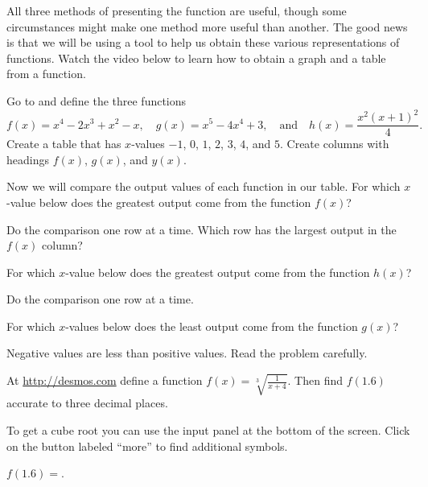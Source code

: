 \documentclass{ximera}
\begin{document}
All three methods of presenting the function are useful, though some circumstances might make one method more useful than another. The good news is that we will be using a tool to help us obtain these various representations of functions. Watch the video below to learn how to obtain a graph and a table from a function.

\begin{question}
Go to  and define the three functions 
\[
f(x)=x^4-2x^3+x^2-x,\quad g(x)=x^5-4x^4+3,\quad\text{and}\quad h(x)=\frac{x^2(x+1)^2}{4}.
\]
Create a table that has $x$-values $-1$, $0$, $1$, $2$, $3$, $4$, and $5$. Create columns with headings $f(x)$, $g(x)$, and $y(x)$.

Now we will compare the output values of each function in our table. For which $x$-value below does the greatest output come from the function $f(x)$?

    \begin{multipleChoice}
    \end{multipleChoice}
    \begin{hint}
    Do the comparison one row at a time. Which row has the largest output in the $f(x)$ column?
    \end{hint}    
For which $x$-value below does the greatest output come from the function $h(x)$?
    \begin{multipleChoice}
    \end{multipleChoice}
    \begin{hint}
    Do the comparison one row at a time.
    \end{hint}
For which $x$-values below does the least output come from the function $g(x)$?
    \begin{multipleChoice}
    \end{multipleChoice}
    \begin{hint}
    Negative values are less than positive values. Read the problem carefully.
    \end{hint}

\end{question}

\begin{question}
At \href{http://desmos.com}{http://desmos.com} define a function $f(x)=\sqrt[3]{\frac{1}{x+4}}$. Then find $f(1.6)$ accurate to three decimal places.

\begin{hint}
To get a cube root you can use the input panel at the bottom of the screen. Click on the button labeled ``more'' to find additional symbols. 
\end{hint}
$f(1.6)=$.

\end{question}
\end{document}
